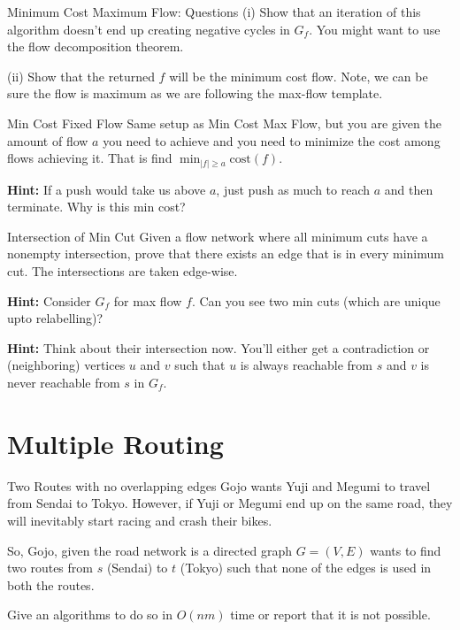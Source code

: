 \documentclass[aspectratio=169,11pt]{beamer}
\newcommand{\blankslides}{%
  \begin{frame}[plain]\end{frame}%
  \begin{frame}[plain]\end{frame}%
}
\begin{document}
\begin{frame}{Minimum Cost Maximum Flow: Questions}
(i) Show that an iteration of this algorithm doesn't end up creating negative cycles in $G_f$.
You might want to use the flow decomposition theorem.

\medskip
(ii) Show that the returned $f$ will be the minimum cost flow. Note, we can be sure the flow is maximum
as we are following the max-flow template.
\end{frame}
\blankslides

\begin{frame}{Min Cost Fixed Flow}
Same setup as Min Cost Max Flow, but you are given the amount of flow $a$ you need to achieve and you
need to minimize the cost among flows achieving it. That is find $\min_{|f|\ge a}\mathrm{cost}(f)$.

\medskip
\textbf{Hint:} If a push would take us above $a$, just push as much to reach $a$ and then terminate.
Why is this min cost?
\end{frame}
\blankslides

\begin{frame}{Intersection of Min Cut}
Given a flow network where all minimum cuts have a nonempty intersection, prove that there exists an
edge that is in every minimum cut. The intersections are taken edge-wise.

\medskip
\textbf{Hint:} Consider $G_f$ for max flow $f$. Can you see two min cuts (which are unique upto relabelling)?

\medskip
\textbf{Hint:} Think about their intersection now. You'll either get a contradiction or (neighboring)
vertices $u$ and $v$ such that $u$ is always reachable from $s$ and $v$ is never reachable from $s$ in $G_f$.
\end{frame}
\blankslides

\section{Multiple Routing}

\begin{frame}{Two Routes with no overlapping edges}
Gojo wants Yuji and Megumi to travel from Sendai to Tokyo. However, if Yuji or Megumi end up on the same
road, they will inevitably start racing and crash their bikes.

\medskip
So, Gojo, given the road network is a directed graph $G=(V,E)$ wants to find two routes from $s$ (Sendai)
to $t$ (Tokyo) such that none of the edges is used in both the routes.

\medskip
Give an algorithms to do so in $O(nm)$ time or report that it is not possible.
\end{frame}
\blankslides
\end{document}
